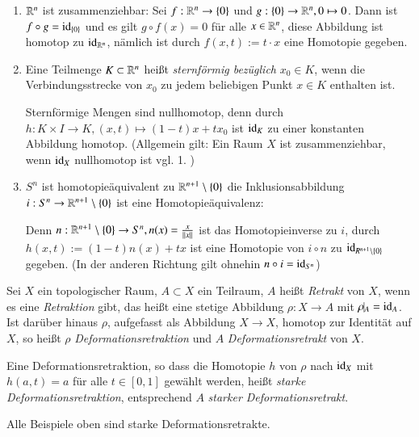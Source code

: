 \documentclass[a4paper,10pt]{scrartcl}
\begin{document}
\begin{exs*}
 \begin{enumerate}
  \item $\mathbb{R}^n$ ist zusammenziehbar: Sei $f: \mathbb{R}^n\to \{0\}$ und $g:\{0\}\to \mathbb{R}^n, 0 \mapsto 0$. Dann ist $f\circ g=\operatorname{id}_{\{0\}}$ und es gilt $g\circ f(x)=0$ für alle $x\in \mathbb{R}^n$, diese Abbildung ist homotop zu $\operatorname{id}_{\mathbb{R}^n}$, nämlich ist durch $f(x,t):= t\cdot x$ eine Homotopie gegeben.
  \item Eine Teilmenge $K\subset \mathbb{R}^n$ heißt \emph{sternförmig bezüglich} $x_0 \in K$, wenn die Verbindungsstrecke von $x_0$ zu jedem beliebigen Punkt $x\in K$ enthalten ist.\\
\begin{figure}[H]
\centering
 \fixme[fig44]
\caption{}
\end{figure}
Sternförmige Mengen sind nullhomotop, denn durch $h: K\times I \to K, (x,t) \mapsto (1-t)x+tx_0$ ist $\operatorname{id}_K$ zu einer konstanten Abbildung homotop. (Allgemein gilt: Ein Raum $X$ ist zusammenziehbar, wenn $\operatorname{id}_X$ nullhomotop ist vgl. 1. )
\item $S^n$ ist homotopieäquivalent zu $\mathbb{R}^{n+1}\setminus\{0\}$ die Inklusionsabbildung $i: S^n\to \mathbb{R}^{n+1}\setminus\{0\}$ ist eine Homotopieäquivalenz:
\begin{figure}[H]
\centering
 \fixme[fig45]
\caption{}
\end{figure}
Denn $n: \mathbb{R}^{n+1}\setminus\{0\} \to S^n, n(x)=\frac{x}{||x||}$ ist das Homotopieinverse zu $i$, durch $h(x,t):=(1-t)n(x)+tx$ ist eine Homotopie von $i\circ n$ zu $\operatorname{id}_{R^{n+1}\setminus \{0\}}$ gegeben.
(In der anderen Richtung gilt ohnehin $n\circ i= \operatorname{id}_{S^n}$)
\end{enumerate}
\end{exs*}
\begin{df}
 Sei $X$ ein topologischer Raum, $A\subset X$ ein Teilraum, $A$ heißt \emph{Retrakt} von $X$, wenn es eine \emph{Retraktion} gibt, das heißt eine stetige Abbildung  $\rho: X\to A$ mit $\rho\vline_A=\id_A$. Ist darüber hinaus $\rho$, aufgefasst als Abbildung $X\to X$, homotop zur Identität auf $X$, so heißt $\rho$ \emph{Deformationsretraktion} und  $A$ \emph{Deformationsretrakt} von $X$.

Eine Deformationsretraktion, so dass die Homotopie $h$ von $\rho$ nach $\operatorname{id}_X$ mit $h(a,t)=a$ für alle $t\in[0,1]$ gewählt werden, heißt \emph{starke Deformationsretraktion}, entsprechend $A$ \emph{starker Deformationsretrakt}.
\end{df}
\begin{note*}
 Alle Beispiele oben sind starke Deformationsretrakte.
\end{note*}
\end{document}

